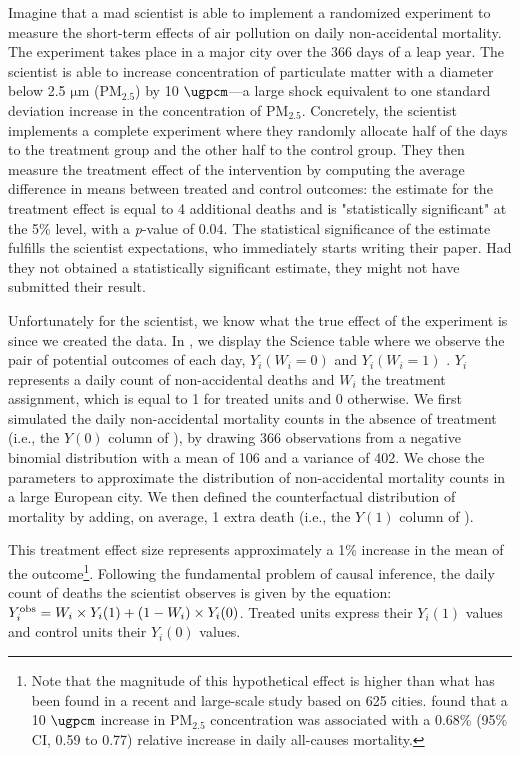 \documentclass[12pt]{article}
\renewcommand{\thefootnote}{\fnsymbol{footnote}}
\begin{document}
    Imagine that a mad scientist is able to implement a randomized experiment to measure the short-term effects of air pollution on daily non-accidental mortality. The experiment takes place in a major city over the 366 days of a leap year. The scientist is able to increase concentration of particulate matter with a diameter below 2.5 $\si{\um}$ (PM$_{2.5}$) by 10 $\si{\ugpcm}$---a large shock equivalent to one standard deviation increase in the concentration of PM$_{2.5}$. Concretely, the scientist implements a complete experiment where they randomly allocate half of the days to the treatment group and the other half to the control group. They then measure the treatment effect of the intervention by computing the average difference in means between treated and control outcomes: the estimate for the treatment effect is equal to 4 additional deaths and is "statistically significant" at the 5\% level, with a \textit{p}-value of 0.04. The statistical significance of the estimate fulfills the scientist expectations, who immediately starts writing their paper. Had they not obtained a statistically significant estimate, they might not have submitted their result. 
    
    Unfortunately for the scientist, we know what the true effect of the experiment is since we created the data. In , we display the Science table where we observe the pair of potential outcomes of each day, $Y_{i}(W_{i}=0)$ and $Y_{i}(W_{i}=1)$ \citep{rubin_estimating_1974}. $Y_{i}$ represents a daily count of non-accidental deaths and $W_{i}$ the treatment assignment, which is equal to 1 for treated units and 0 otherwise. We first simulated the daily non-accidental mortality counts in the absence of treatment (i.e., the $Y(0)$ column of ), by drawing 366 observations from a negative binomial distribution with a mean of 106 and a variance of 402. We chose the parameters to approximate the distribution of non-accidental mortality counts in a large European city. We then defined the counterfactual distribution of mortality by adding, on average, 1 extra death (i.e., the $Y(1)$ column of ). 
    
            
            
    \renewcommand*{\thefootnote}{\arabic{footnote}}
    \setcounter{footnote}{0}

    \noindent This treatment effect size represents approximately a 1\% increase in the mean of the outcome\footnote{Note that the magnitude of this hypothetical effect is higher than what has been found in a recent and large-scale study based on 625 cities. \cite{liu_ambient_2019} found that a 10 $\si{\ugpcm}$ increase in $\text{PM}_{2.5}$ concentration was associated with a 0.68\% (95\% CI, 0.59 to 0.77) relative increase in daily all-causes mortality.}. Following the fundamental problem of causal inference, the daily count of deaths the scientist observes is given by the equation: $Y_{i}^{\textnormal{obs}} = W_{i} \times Y_{i}(1) + (1-W_{i})\times Y_{i}(0)$. Treated units express their $Y_{i}(1)$ values and control units their $Y_{i}(0)$ values. 
    
\end{document}
